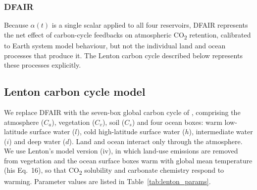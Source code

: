 
\subsubsection{DFAIR}
Because $\alpha(t)$ is a single scalar applied to all four reservoirs, DFAIR represents the net effect of carbon-cycle feedbacks on atmospheric CO\textsubscript{2} retention, calibrated to Earth system model behaviour, but not the individual land and ocean processes that produce it. The Lenton carbon cycle described below represents these processes explicitly.

\subsection{Lenton carbon cycle model}

We replace DFAIR with the seven-box global carbon cycle of \citet{lentonLandOceanCarbon2000}, comprising the atmosphere ($C_a$), vegetation ($C_v$), soil ($C_s$) and four ocean boxes: warm low-latitude surface water ($l$), cold high-latitude surface water ($h$), intermediate water ($i$) and deep water ($d$). Land and ocean interact only through the atmosphere. We use Lenton's model version (iv), in which land-use emissions are removed from vegetation and the ocean surface boxes warm with global mean temperature (his Eq.~16), so that CO\textsubscript{2} solubility and carbonate chemistry respond to warming. Parameter values are listed in Table~\ref{tab:lenton_params}.

